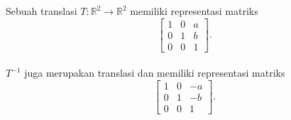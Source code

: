 \begin{theorem} \citep{Diesche} \label{thm:translasi}
	Sebuah translasi $T:\mathbb{R}^2\to\mathbb{R}^2$ memiliki representasi matriks \vspace*{-0.25cm}
	\begin{equation*}
		\begin{bmatrix}
			1&0&a\\
			0&1&b\\
			0&0&1
		\end{bmatrix}.
	\end{equation*} \vspace*{-0.25cm} \\
	\noindent $T^{-1}$ juga merupakan translasi dan memiliki representasi matriks \vspace*{-0.25cm}
	\begin{equation*}
		\begin{bmatrix}
			1&0&-a\\
			0&1&-b\\
			0&0&1
		\end{bmatrix}. 
	\end{equation*}\vspace{-0.25 cm}
\end{theorem}

